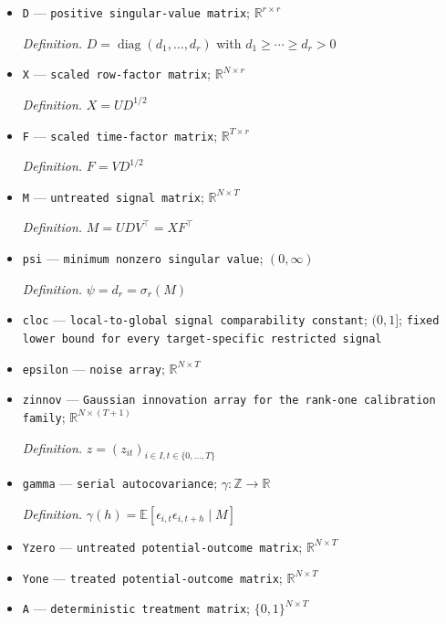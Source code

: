 \documentclass{article}
\begin{document}
\begin{itemize}
  \item \texttt{D} --- \texttt{positive singular-\allowbreak{}value matrix}; \(\mathbb R^{r\times r}\)
  \par\smallskip\noindent\emph{Definition.} \(D=\operatorname{diag}(d_1,\ldots,d_r)\) with \(d_1\ge\cdots\ge d_r>0\)
  \item \texttt{X} --- \texttt{scaled row-\allowbreak{}factor matrix}; \(\mathbb R^{N\times r}\)
  \par\smallskip\noindent\emph{Definition.} \(X=UD^{1/2}\)
  \item \texttt{F} --- \texttt{scaled time-\allowbreak{}factor matrix}; \(\mathbb R^{T\times r}\)
  \par\smallskip\noindent\emph{Definition.} \(F=VD^{1/2}\)
  \item \texttt{M} --- \texttt{untreated signal matrix}; \(\mathbb R^{N\times T}\)
  \par\smallskip\noindent\emph{Definition.} \(M=UDV^{\top}=XF^{\top}\)
  \item \texttt{psi} --- \texttt{minimum nonzero singular value}; \((0,\infty)\)
  \par\smallskip\noindent\emph{Definition.} \(\psi=d_r=\sigma_r(M)\)
  \item \texttt{cloc} --- \texttt{local-\allowbreak{}to-\allowbreak{}global signal comparability constant}; \((0,1]\); \texttt{fixed lower bound for every target-\allowbreak{}specific restricted signal}
  \item \texttt{epsilon} --- \texttt{noise array}; \(\mathbb R^{N\times T}\)
  \item \texttt{zinnov} --- \texttt{Gaussian innovation array for the rank-\allowbreak{}one calibration family}; \(\mathbb R^{N\times(T+1)}\)
  \par\smallskip\noindent\emph{Definition.} \(z=(z_{it})_{i\in I,t\in\{0,\ldots,T\}}\)
  \item \texttt{gamma} --- \texttt{serial autocovariance}; \(\gamma:\mathbb Z\to\mathbb R\)
  \par\smallskip\noindent\emph{Definition.} \(\gamma(h)=\mathbb E[\epsilon_{i,t}\epsilon_{i,t+h}\mid M]\)
  \item \texttt{Yzero} --- \texttt{untreated potential-\allowbreak{}outcome matrix}; \(\mathbb R^{N\times T}\)
  \item \texttt{Yone} --- \texttt{treated potential-\allowbreak{}outcome matrix}; \(\mathbb R^{N\times T}\)
  \item \texttt{A} --- \texttt{deterministic treatment matrix}; \(\{0,1\}^{N\times T}\)

\end{itemize}
\end{document}
